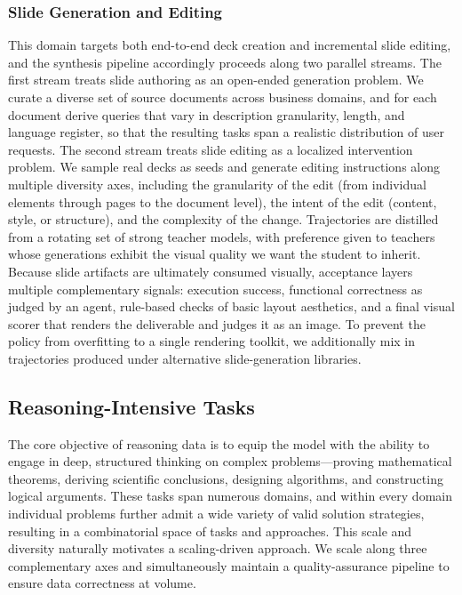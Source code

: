 \subsubsection{Slide Generation and Editing}

This domain targets both end-to-end deck creation and incremental slide editing, and the synthesis pipeline accordingly proceeds along two parallel streams. The first stream treats slide authoring as an open-ended generation problem. We curate a diverse set of source documents across business domains, and for each document derive queries that vary in description granularity, length, and language register, so that the resulting tasks span a realistic distribution of user requests. The second stream treats slide editing as a localized intervention problem. We sample real decks as seeds and generate editing instructions along multiple diversity axes, including the granularity of the edit (from individual elements through pages to the document level), the intent of the edit (content, style, or structure), and the complexity of the change. Trajectories are distilled from a rotating set of strong teacher models, with preference given to teachers whose generations exhibit the visual quality we want the student to inherit. Because slide artifacts are ultimately consumed visually, acceptance layers multiple complementary signals: execution success, functional correctness as judged by an agent, rule-based checks of basic layout aesthetics, and a final visual scorer that renders the deliverable and judges it as an image. To prevent the policy from overfitting to a single rendering toolkit, we additionally mix in trajectories produced under alternative slide-generation libraries.

\subsection{Reasoning-Intensive Tasks}
\label{sec:reasoning-data}

The core objective of reasoning data is to equip the model with the ability to engage in deep, structured thinking on complex problems---proving mathematical theorems, deriving scientific conclusions, designing algorithms, and constructing logical arguments. These tasks span numerous domains, and within every domain individual problems further admit a wide variety of valid solution strategies, resulting in a combinatorial space of tasks and approaches. This scale and diversity naturally motivates a scaling-driven approach. We scale along three complementary axes and simultaneously maintain a quality-assurance pipeline to ensure data correctness at volume.

